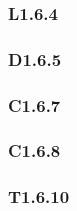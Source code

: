 \documentclass{article}
\begin{document}
\begin{multicols*}{3}
\subsubsection*{L1.6.4}

\subsubsection*{D1.6.5}

\subsubsection*{C1.6.7}

\subsubsection*{C1.6.8}

\subsubsection*{T1.6.10}

\end{multicols*}
\end{document}
